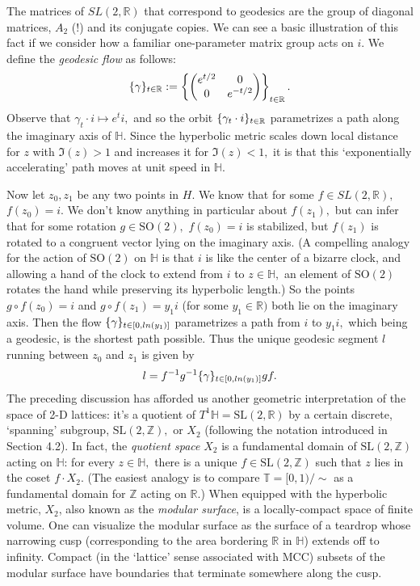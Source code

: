 \documentclass[12pt, letterpaper, oneside]{book}
\renewcommand{\gg}{\ensuremath{\gamma}}
\newcommand{\Hyp}{\mathbb{H}}
\newcommand{\R}{\mathbb{R}}
\newcommand{\Z}{\mathbb{Z}}
\newcommand{\T}{\mathbb{T}}
\DeclarePairedDelimiter{\set}{\lbrace}{\rbrace}
\theoremstyle{plain}
\theoremstyle{definition}
\theoremstyle{remark}
\begin{document}
The matrices of $SL(2,\R)$ that correspond to geodesics are the group of diagonal matrices, $A_2$ (!) and its conjugate copies. We can see a basic illustration of this fact if we consider how a familiar one-parameter matrix group acts on $i.$ We define the \textit{geodesic flow} as follows: 
\[
\set{\gg}_{t \in \R} := \left \{ \begin{pmatrix} e^{t/2} & 0 \\ 0 & e^{-t/2} \end{pmatrix} \right \}_{t \in \R}.
\]
Observe that $\gg_t \cdot i \mapsto e^ti,$ and so the orbit $\set{\gg_t \cdot i}_{t \in \R}$ parametrizes a path along the imaginary axis of $\Hyp.$ Since the hyperbolic metric scales down local distance for $z$ with $\Im(z) > 1$ and increases it for $\Im(z) < 1,$ it is that this `exponentially accelerating' path moves at unit speed in $\Hyp.$ 

Now let $z_0, z_1$ be any two points in $H.$ We know that for some $f \in SL(2,\R),$ $f(z_0) = i.$ We don't know anything in particular about $f(z_1),$ but can infer that for some rotation $g \in \mbox{SO}(2),$ $f(z_0) = i$ is stabilized, but $f(z_1)$ is rotated to a congruent vector lying on the imaginary axis. (A compelling analogy for the action of $\mbox{SO}(2)$ on $\Hyp$ is that $i$ is like the center of a bizarre clock, and allowing a hand of the clock to extend from $i$ to $z \in \Hyp,$ an element of $\mbox{SO}(2)$ rotates the hand while preserving its hyperbolic length.) So the points $g\circ f(z_0) = i$ and $g\circ f(z_1) = y_1i$ (for some $y_1 \in \R)$ both lie on the imaginary axis. Then the flow $\set{\gg}_{t \in [0, ln(y_1)]}$ parametrizes a path from $i$ to $y_1i,$ which being a geodesic, is the shortest path possible. Thus the unique geodesic segment $l$ running between $z_0$ and $z_1$ is given by
\[
l = f^{-1}g^{-1}\set{\gamma}_{t \in [0, ln(y_1)]}gf.
\]
The preceding discussion has afforded us another geometric interpretation of the space of 2-D lattices: it's a quotient of $T^1\Hyp = \mbox{SL}(2,\R)$ by a certain discrete, `spanning' subgroup, $\mbox{SL}(2,\Z),$ or $X_2$ (following the notation introduced in Section 4.2). In fact, the \textit{quotient space} $X_2$ is a fundamental domain of $\mbox{SL}(2,\Z)$ acting on $\Hyp$: for every $z \in \Hyp,$ there is a unique $f \in \mbox{SL}(2,\Z)$ such that $z$ lies in the coset $f \cdot X_2.$ (The easiest analogy is to compare $\T = [0,1)/ \sim$ as a fundamental domain for $\Z$ acting on $\R.$) When equipped with the hyperbolic metric, $X_2$, also known as the \textit{modular surface}, is a locally-compact space of finite volume. One can visualize the modular surface as the surface of a teardrop whose narrowing cusp (corresponding to the area bordering $\R$ in $\Hyp$) extends off to infinity. Compact (in the `lattice' sense associated with MCC) subsets of the modular surface have boundaries that terminate somewhere along the cusp. 
\end{document}
